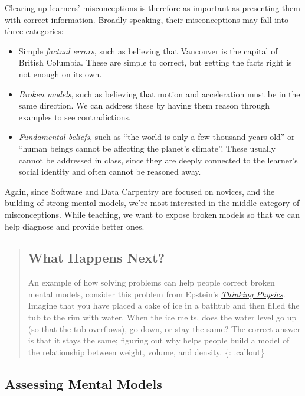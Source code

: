 Clearing up learners' misconceptions is therefore as important as
presenting them with correct information. Broadly speaking, their
misconceptions may fall into three categories:

\begin{itemize}
\itemsep1pt\parskip0pt
\item
  Simple \emph{factual errors}, such as believing that Vancouver is the
  capital of British Columbia. These are simple to correct, but getting
  the facts right is not enough on its own.
\item
  \emph{Broken models}, such as believing that motion and acceleration
  must be in the same direction. We can address these by having them
  reason through examples to see contradictions.
\item
  \emph{Fundamental beliefs}, such as ``the world is only a few thousand
  years old'' or ``human beings cannot be affecting the planet's
  climate''. These usually cannot be addressed in class, since they are
  deeply connected to the learner's social identity and often cannot be
  reasoned away.
\end{itemize}

Again, since Software and Data Carpentry are focused on novices, and the
building of strong mental models, we're most interested in the middle
category of misconceptions. While teaching, we want to expose broken
models so that we can help diagnose and provide better ones.

\begin{quote}
\subsection{What Happens Next?}\label{what-happens-next}

An example of how solving problems can help people correct broken mental
models, consider this problem from Epstein's
\emph{\href{http://www.amazon.com/Thinking-Physics-Understandable-Practical-Reality/dp/0935218084/r}{Thinking
Physics}}. Imagine that you have placed a cake of ice in a bathtub and
then filled the tub to the rim with water. When the ice melts, does the
water level go up (so that the tub overflows), go down, or stay the
same? The correct answer is that it stays the same; figuring out why
helps people build a model of the relationship between weight, volume,
and density. \{: .callout\}
\end{quote}

\subsection{Assessing Mental Models}\label{assessing-mental-models}

